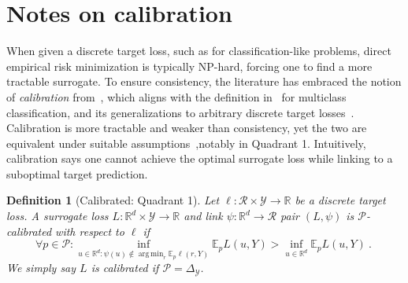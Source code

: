 \documentclass[11pt]{article} %
\newcommand{\reals}{\mathbb{R}}
\newcommand{\simplex}{\Delta_\Y}
\newcommand{\E}{\mathbb{E}}
\newcommand{\R}{\mathcal{R}}
\renewcommand{\P}{\mathcal{P}}
\newcommand{\Y}{\mathcal{Y}}
\newcommand{\exploss}[3]{\E_{#3} #1(#2,Y)}
\newtheorem{definition}{Definition}
\DeclareMathOperator*{\argmin}{arg\,min}
\begin{document}
\section{Notes on calibration}\label{app:calibration}

When given a discrete target loss, such as for classification-like problems, direct empirical risk minimization is typically NP-hard, forcing one to find a more tractable surrogate.
To ensure consistency, the literature has embraced the notion of \emph{calibration} from~\citet[Chapter 3]{steinwart2008support}, which aligns with the definition in~\citet{tewari2007consistency} for multiclass classification, and its generalizations to arbitrary discrete target losses~\citep{agarwal2015consistent,ramaswamy2016convex}.
Calibration is more tractable and weaker than consistency, yet the two are equivalent under suitable assumptions~\citep{tewari2007consistency,ramaswamy2016convex},notably in Quadrant 1.
Intuitively, calibration says one cannot achieve the optimal surrogate loss while linking to a suboptimal target prediction.


\begin{definition}[Calibrated: Quadrant 1]\label{def:calibrated-finite}
	Let $\ell : \R \times \Y \to \reals$ be a discrete target loss.
	A surrogate loss $L : \reals^d \times \Y \to \reals$  and link $\psi:\reals^d \to \R$ pair $(L, \psi)$ is \emph{$\P$-calibrated with respect to} $\ell$ if 
	\begin{equation}\label{eq:calibration}
	\forall p \in \P: \inf_{u \in \reals^d : \psi(u) \not \in \argmin_r \E_p\ell(r,Y)} \exploss{L}{u}{p} > \inf_{u \in \reals^d} \exploss{L}{u}{p}~.~
	\end{equation}
	We simply say $L$ is calibrated if $\P = \simplex$.
\end{definition}
\end{document}

